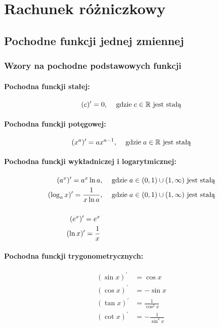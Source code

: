 \documentclass[../Matematyka.tex]{subfiles}
\begin{document}
    \section{Rachunek różniczkowy}

    \subsection{Pochodne funkcji jednej zmiennej}

    \subsubsection{Wzory na pochodne podstawowych funkcji}

    \paragraph{Pochodna funckji stałej:}
    \[ (c)^\prime = 0 \text{, \quad gdzie} \; c \in \mathbb{R} \text{ jest stałą} \]
    
    \paragraph{Pochodna funckji potęgowej:}
    \[ (x^a)^\prime = ax^{a-1} \text{, \quad gdzie} \; a \in \mathbb{R} \text{ jest stałą} \]
    
    \paragraph{Pochodna funckji wykładniczej i logarytmicznej:}
    \begin{align*}
        (a^x)^\prime = a^x \ln a &\text{, \quad gdzie} \; a \in (0, 1) \cup (1, \infty) \text{ jest stałą} \\
        (\log_a x)^\prime = \frac{1}{x \ln a} &\text{, \quad gdzie} \; a \in (0, 1) \cup (1, \infty) \text{ jest stałą} \\
        \\
        (e^x)^\prime = e^x \\
        (\ln x)^\prime = \frac{1}{x}
    \end{align*}

    \paragraph{Pochodna funckji trygonometrycznych:}
    \begin{align*}
        (\sin x)^\prime &= \cos x \\
        (\cos x)^\prime &= - \sin x \\
        (\tan x)^\prime &= \frac{1}{\cos^2 x} \\
        (\cot x)^\prime &= - \frac{1}{\sin^2 x} \\
    \end{align*}
\end{document}
